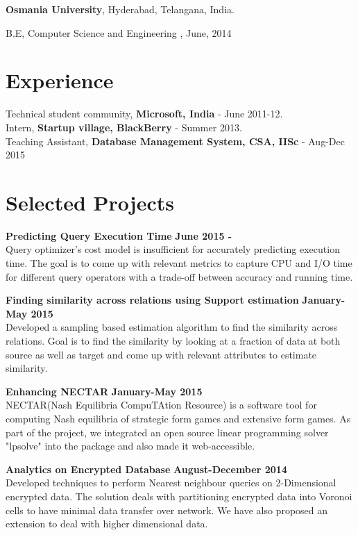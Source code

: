 \documentclass[margin,line]{res}
\newenvironment{list1}{
  \begin{list}{\ding{113}}{%
      \setlength{\itemsep}{0in}
      \setlength{\parsep}{0in} \setlength{\parskip}{0in}
      \setlength{\topsep}{0in} \setlength{\partopsep}{0in} 
      \setlength{\leftmargin}{0.17in}}}{\end{list}}
\begin{document}
\begin{resume}
{\bf Osmania University}, Hyderabad, Telangana, India.\\
\vspace*{-.1in}
\begin{list1}
\item[] B.E, Computer Science and Engineering ,  June, 2014
\end{list1}
\section{\sc Experience}

Technical student community, {\bf Microsoft, India} - June 2011-12.\\
Intern, {\bf Startup village, BlackBerry} - Summer 2013. \\
Teaching Assistant,  {\bf Database Management System, CSA, IISc} - Aug-Dec 2015
\section{\sc Selected Projects}
{\bf Predicting Query Execution Time}
\hfill {\bf June 2015  - }\\
Query optimizer's cost model is insufficient for accurately predicting execution time. The goal is to come up with relevant metrics to capture CPU and I/O time for different query operators with a trade-off between accuracy and running time. 

{\bf Finding similarity across relations using Support estimation}
\hfill {\bf January-May 2015}\\
Developed a sampling based estimation algorithm to find the similarity across relations. Goal is to find the similarity by looking at a fraction of data at both source as well as target and come up with relevant attributes to estimate similarity. 

{\bf Enhancing NECTAR}
\hfill {\bf  January-May 2015}\\
NECTAR(Nash Equilibria CompuTAtion Resource) is a software tool for computing Nash equilibria of strategic form games and extensive form games. As part of the project, we integrated an open source linear programming solver "lpsolve" into the package and also made it web-accessible.

{\bf Analytics on Encrypted Database}
\hfill {\bf  August-December 2014}\\
Developed techniques to perform Nearest neighbour queries on 2-Dimensional encrypted data. The solution deals with partitioning encrypted  data into Voronoi cells to have minimal data transfer over network. We have also proposed an extension to deal with higher dimensional data.


\end{resume}
\end{document}
